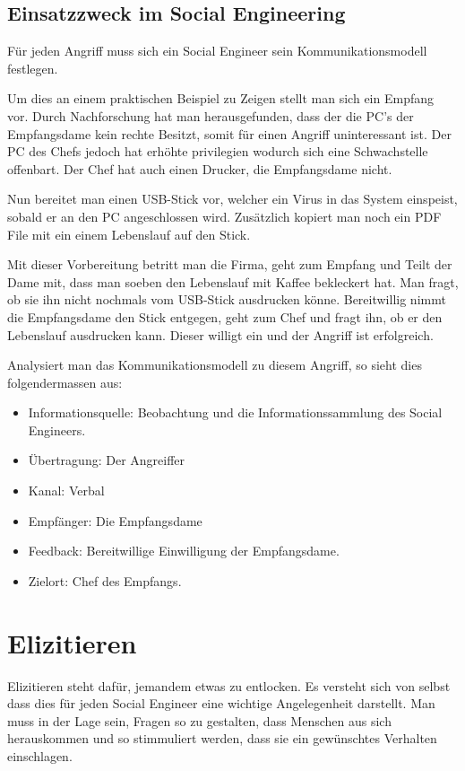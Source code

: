 \subsection{Einsatzzweck im Social Engineering}
Für jeden Angriff muss sich ein Social Engineer sein Kommunikationsmodell festlegen. 

Um dies an einem praktischen Beispiel zu Zeigen stellt man sich ein Empfang vor. Durch Nachforschung hat man herausgefunden, dass der die PC's der Empfangsdame kein rechte Besitzt, somit für einen Angriff uninteressant ist. Der PC des Chefs jedoch hat erhöhte privilegien wodurch sich eine Schwachstelle offenbart. Der Chef hat auch einen Drucker, die Empfangsdame nicht.

Nun bereitet man einen USB-Stick vor, welcher ein Virus in das System einspeist, sobald er an den PC angeschlossen wird. Zusätzlich kopiert man noch ein PDF File mit ein einem Lebenslauf auf den Stick. 

Mit dieser Vorbereitung betritt man die Firma, geht zum Empfang und Teilt der Dame mit, dass man soeben den Lebenslauf mit Kaffee bekleckert hat. Man fragt, ob sie ihn nicht nochmals vom USB-Stick ausdrucken könne. Bereitwillig nimmt die Empfangsdame den Stick entgegen, geht zum Chef und fragt ihn, ob er den Lebenslauf ausdrucken kann. Dieser willigt ein und der Angriff ist erfolgreich.

Analysiert man das Kommunikationsmodell zu diesem Angriff, so sieht dies folgendermassen aus:
\begin{itemize}
\item Informationsquelle: Beobachtung und die Informationssammlung des Social Engineers.
\item Übertragung: Der Angreiffer
\item Kanal: Verbal
\item Empfänger: Die Empfangsdame
\item Feedback: Bereitwillige Einwilligung der Empfangsdame.
\item Zielort: Chef des Empfangs.
\end{itemize}

\section{Elizitieren}
Elizitieren steht dafür, jemandem etwas zu entlocken. Es versteht sich von selbst dass dies für jeden Social Engineer eine wichtige Angelegenheit darstellt. Man muss in der Lage sein, Fragen so zu gestalten, dass Menschen aus sich herauskommen und so stimmuliert werden, dass sie ein gewünschtes Verhalten einschlagen.

